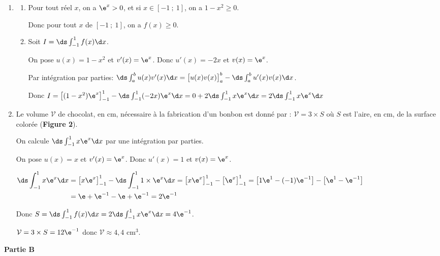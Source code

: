\begin{enumerate}
\item 
	\begin{enumerate}
		\item 
Pour tout réel $x$, on a $\e^{x}>0$, et si $x\in 	[-1~;~1]$, on a $1-x^2\geqslant 0$. 

Donc pour tout $x$ de $[-1~;~1]$, on a $f(x)\geqslant 0$.
		
		\item 
Soit $I= \ds\int_{-1}^1 f(x) \d x$.

On pose $u(x)=1-x^2$ et $v'(x)=\e^{x}$. Donc $u'(x)=-2x$ et $v(x)=\e^{x}$.

Par intégration par parties: $\ds\int_{a}^{b} u(x)v'(x) \d x = \left [ u(x)v(x)\strut\right ]_{a}^{b} - \ds\int_{a}^{b} u'(x)v(x) \d x$.

Donc $I= \left [ (1-x^2)\e^{x} \strut \right ]_{-1}^{1} - \ds\int_{-1}^{1} (-2x)\e^{x} \d x
= 0+2 \ds\int_{-1}^{1} x\e^{x} \d x =  2\ds\int_{-1}^{1} x\e^{x} \d x$
	\end{enumerate}
	
\item Le volume $\mathcal{V}$ de chocolat, en cm, nécessaire à la fabrication d'un bonbon est donné par :
$\mathcal{V} = 3 \times S$
où $S$ est l'aire, en cm, de la surface colorée (\textbf{Figure 2}).



On calcule $\ds\int_{-1}^{1} x\e^{x} \d x$ par une intégration par parties.

On pose $u(x)=x$ et $v'(x)=\e^{x}$. Donc $u'(x)=1$ et $v(x)=\e^{x}$.

$\begin{aligned}
\ds\int_{-1}^{1} x\e^{x} \d x
& = \left [ x \e^{x} \strut \right ]_{-1}^{1} - \ds\int_{-1}^{1} 1\times \e^{x} \d x
= \left [ x \e^{x} \strut \right ]_{-1}^{1} - \left [  \e^{x} \strut \right ]_{-1}^{1}
= \left [ 1 \e^{1} - (-1)\e^{-1} \strut \right ] -  \left [ \e^{1} - \e^{-1} \strut \right ]\\
& = \e + \e^{-1} -\e +\e^{-1} = 2 \e^{-1}
\end{aligned}$ 

Donc $S = \ds\int_{-1}^{1} f(x) \d x = 2 \ds\int_{-1}^{1} x\e^{x} \d x = 4 \e^{-1}$.

$\mathcal{V} = 3 \times S = 12\e^{-1}$ donc $\mathcal{V} \approx 4,4$ cm$^3$.
\end{enumerate}

\smallskip

\begin{center}
\textbf{Partie B}
\end{center}

